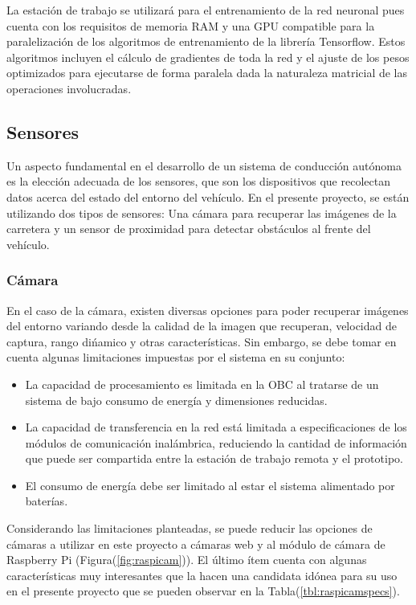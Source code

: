     La estación de trabajo se utilizará para el entrenamiento de la red neuronal pues cuenta con los requisitos de memoria RAM y una 
    GPU compatible para la paralelización de los algoritmos de entrenamiento de la librería Tensorflow. Estos algoritmos incluyen 
    el cálculo de gradientes de toda la red y el ajuste de los pesos optimizados para ejecutarse de forma paralela dada la naturaleza
    matricial de las operaciones involucradas.

    \subsection{Sensores}
    Un aspecto fundamental en el desarrollo de un sistema de conducción autónoma es la elección adecuada de los sensores, que son 
    los dispositivos que recolectan datos acerca del estado del entorno del vehículo. En el presente proyecto, se están utilizando 
    dos tipos de sensores: Una cámara para recuperar las imágenes de la carretera y un sensor de proximidad para detectar obstáculos 
    al frente del vehículo.
        \subsubsection{Cámara}\label{sec:raspicam}
        En el caso de la cámara, existen diversas opciones para poder recuperar imágenes del entorno variando desde la calidad 
        de la imagen que recuperan, velocidad de captura, rango dińamico y otras características. Sin embargo, se debe tomar 
        en cuenta algunas limitaciones impuestas por el sistema en su conjunto:

        \begin{itemize}
            \item La capacidad de procesamiento es limitada en la OBC al tratarse de un sistema de bajo consumo de energía y dimensiones reducidas.
            \item La capacidad de transferencia en la red está limitada a especificaciones de los módulos de comunicación inalámbrica, reduciendo la cantidad de información que puede ser compartida entre la estación de trabajo remota y el prototipo.
            \item El consumo de energía debe ser limitado al estar el sistema alimentado por baterías.
        \end{itemize}

        Considerando las limitaciones planteadas, se puede reducir las opciones de cámaras a utilizar en este proyecto a cámaras web 
        y al módulo de cámara de Raspberry Pi (Figura(\ref{fig:raspicam})). El último ítem cuenta con algunas características muy interesantes que la hacen una 
        candidata idónea para su uso en el presente proyecto que se pueden observar en la Tabla(\ref{tbl:raspicamspecs}).

